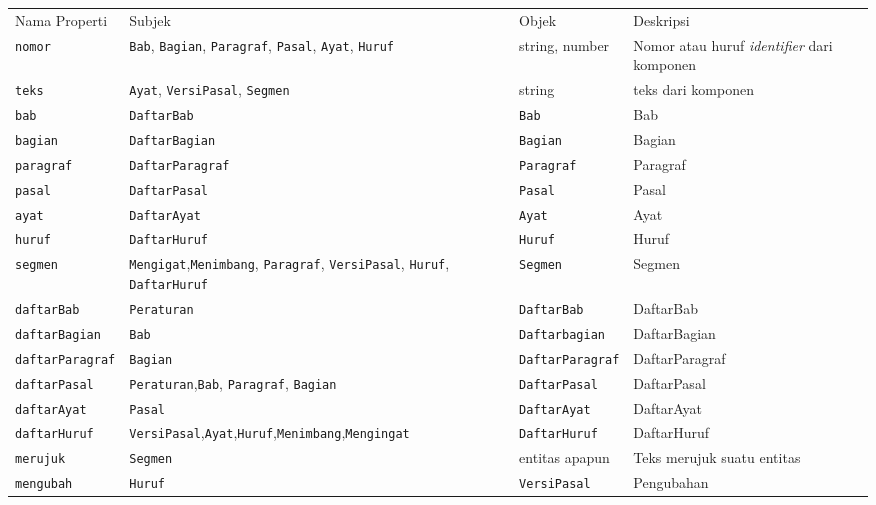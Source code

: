 \begin{longtable}[c]{@{}llll@{}}
\toprule\addlinespace
Nama Properti & Subjek & Objek & Deskripsi
\\\addlinespace
\midrule\endhead
\texttt{nomor} & \texttt{Bab}, \texttt{Bagian}, \texttt{Paragraf},
\texttt{Pasal}, \texttt{Ayat}, \texttt{Huruf} & string, number & Nomor
atau huruf \emph{identifier} dari komponen
\\\addlinespace
\texttt{teks} & \texttt{Ayat}, \texttt{VersiPasal}, \texttt{Segmen} &
string & teks dari komponen
\\\addlinespace
\texttt{bab} & \texttt{DaftarBab} & \texttt{Bab} & Bab
\\\addlinespace
\texttt{bagian} & \texttt{DaftarBagian} & \texttt{Bagian} & Bagian
\\\addlinespace
\texttt{paragraf} & \texttt{DaftarParagraf} & \texttt{Paragraf} &
Paragraf
\\\addlinespace
\texttt{pasal} & \texttt{DaftarPasal} & \texttt{Pasal} & Pasal
\\\addlinespace
\texttt{ayat} & \texttt{DaftarAyat} & \texttt{Ayat} & Ayat
\\\addlinespace
\texttt{huruf} & \texttt{DaftarHuruf} & \texttt{Huruf} & Huruf
\\\addlinespace
\texttt{segmen} & \texttt{Mengigat},\texttt{Menimbang},
\texttt{Paragraf}, \texttt{VersiPasal}, \texttt{Huruf},
\texttt{DaftarHuruf} & \texttt{Segmen} & Segmen
\\\addlinespace
\texttt{daftarBab} & \texttt{Peraturan} & \texttt{DaftarBab} & DaftarBab
\\\addlinespace
\texttt{daftarBagian} & \texttt{Bab} & \texttt{Daftarbagian} &
DaftarBagian
\\\addlinespace
\texttt{daftarParagraf} & \texttt{Bagian} & \texttt{DaftarParagraf} &
DaftarParagraf
\\\addlinespace
\texttt{daftarPasal} & \texttt{Peraturan},\texttt{Bab},
\texttt{Paragraf}, \texttt{Bagian} & \texttt{DaftarPasal} & DaftarPasal
\\\addlinespace
\texttt{daftarAyat} & \texttt{Pasal} & \texttt{DaftarAyat} & DaftarAyat
\\\addlinespace
\texttt{daftarHuruf} &
\texttt{VersiPasal},\texttt{Ayat},\texttt{Huruf},\texttt{Menimbang},\texttt{Mengingat}
& \texttt{DaftarHuruf} & DaftarHuruf
\\\addlinespace
\texttt{merujuk} & \texttt{Segmen} & entitas apapun & Teks merujuk suatu
entitas
\\\addlinespace
\texttt{mengubah} & \texttt{Huruf} & \texttt{VersiPasal} & Pengubahan

\end{longtable}
